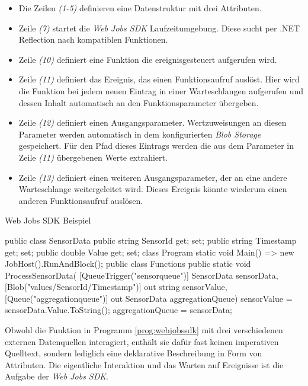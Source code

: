 \begin{itemize}
	\item Die Zeilen \textit{(1-5)} definieren eine Datenstruktur mit drei Attributen.
	\item Zeile \textit{(7)} startet die \textit{Web Jobs SDK} Laufzeitumgebung. Diese sucht per .NET Reflection nach kompatiblen Funktionen.
	\item Zeile \textit{(10)} definiert eine Funktion die ereignisgesteuert aufgerufen wird.
	\item Zeile \textit{(11)} definiert das Ereignis, das einen Funktionsaufruf auslöst. Hier wird die Funktion bei jedem neuen Eintrag in einer Warteschlangen aufgerufen und dessen Inhalt automatisch an den Funktionsparameter übergeben.
	\item Zeile \textit{(12)} definiert einen Ausgangsparameter. Wertzuweisungen an diesen Parameter werden automatisch in dem konfigurierten \textit{Blob Storage} gespeichert. Für den Pfad dieses Eintrags werden die aus dem Parameter in Zeile \textit{(11)} übergebenen Werte extrahiert.
	\item Zeile \textit{(13)} definiert einen weiteren Ausgangsparameter, der an eine andere Warteschlange weitergeleitet wird. Dieses Ereignis könnte wiederum einen anderen Funktionsaufruf auslösen. 
\end{itemize}

\begin{program}[!hbt]
\caption{Web Jobs SDK Beispiel}
\label{prog:webjobssdk}
\begin{CsCode}
public class SensorData {
  public string SensorId { get; set; }
  public string Timestamp { get; set; }
  public double Value { get; set; }
}
class Program {
  static void Main() => new JobHost().RunAndBlock();
}
public class Functions {
  public static void ProcessSensorData(
    [QueueTrigger("sensorqueue")] SensorData sensorData,
    [Blob("values/{SensorId}/{Timestamp}")] out string sensorValue,
    [Queue("aggregationqueue")] out SensorData aggregationQueue) {
    sensorValue = sensorData.Value.ToString();
    aggregationQueue = sensorData;
  }
}
\end{CsCode}
\end{program}

Obwohl die Funktion in Programm \ref{prog:webjobssdk} mit drei verschiedenen externen Datenquellen interagiert, enthält sie dafür fast keinen imperativen Quelltext, sondern lediglich eine deklarative Beschreibung in Form von Attributen. Die eigentliche Interaktion und das Warten auf Ereignisse ist die Aufgabe der \textit{Web Jobs SDK}. 

